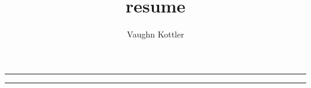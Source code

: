 \documentclass[letterpaper,10pt]{article}
\title{resume}
\author{Vaughn Kottler}
\newcommand{\HR}{{\centering\noindent\rule{7.75in}{0.5pt}}\break}
\begin{document}
%
\noindent
\noindent
\noindent
\HR

\noindent
\noindent
\HR

\noindent
\noindent
\end{document}
